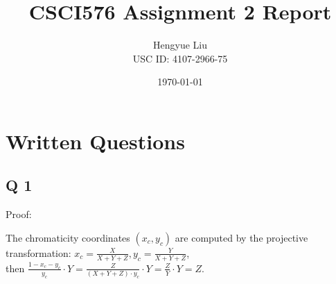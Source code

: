 \documentclass[10pt]{report}            %
\title{\bf CSCI576 Assignment 2 Report}  %
\author{Hengyue Liu\\USC ID: 4107-2966-75}              %
\date{\today}                           %
\begin{document}
\maketitle                              %
\setcounter{page}{2}                    %
\renewcommand{\chaptername}{Part}
\chapter{Written Questions}                %

 
\section*{Q 1}                  %
\par Proof:

The chromaticity coordinates $(x_c,y_c)$ are computed by the projective transformation:
$x_c=\frac{X}{X+Y+Z}, y_c=\frac{Y}{X+Y+Z}$,\\
then $\frac{1-x_c-y_c}{y_c}\cdot Y=\frac{Z}{(X+Y+Z)\cdot y_c}\cdot Y=\frac{Z}{Y}\cdot Y=Z$.                      
  
\end{document}

